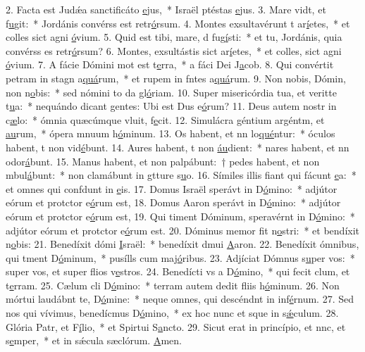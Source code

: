 2. Facta est Judǽa sanctificáto \uline{e}jus,~* Israël ptéstas \uline{e}jus.
3. Mare vidt, et f\uline{u}git:~* Jordánis convérss est retr\uline{ó}rsum.
4. Montes exsultavérunt t ar\uline{í}etes,~* et colles sict agni \uline{ó}vium.
5. Quid est tibi, mare, d fug\uline{í}sti:~* et tu, Jordánis, quia convérss es retr\uline{ó}rsum?
6. Montes, exsultástis sict ar\uline{í}etes,~* et colles, sict agni \uline{ó}vium.
7. A fácie Dómini mot est t\uline{e}rra,~* a fáci Dei J\uline{a}cob.
8. Qui convértit petram in stagn a\uline{quá}rum,~* et rupem in fntes a\uline{quá}rum.
9. Non nobis, Dómin, non n\uline{o}bis:~* sed nómini to da gl\uline{ó}riam.
10. Super misericórdia tua, et veritte t\uline{u}a:~* nequándo dicant gentes: Ubi est Dus e\uline{ó}rum?
11. Deus autem nostr in c\uline{æ}lo:~* ómnia quæcúmque vluit, f\uline{e}cit.
12. Simulácra géntium argéntm, et \uline{au}rum,~* ópera mnuum h\uline{ó}minum.
13. Os habent, et nn lo\uline{qué}ntur:~* óculos habent, t non vid\uline{é}bunt.
14. Aures habent, t non \uline{áu}dient:~* nares habent, et nn odor\uline{á}bunt.
15. Manus habent, et non palpábunt:~† pedes habent, et non mbul\uline{á}bunt:~* non clamábunt in gtture s\uline{u}o.
16. Símiles illis fiant qui fácunt \uline{e}a:~* et omnes qui confdunt in \uline{e}is.
17. Domus Israël sperávt in D\uline{ó}mino:~* adjútor eórum et protctor e\uline{ó}rum est,
18. Domus Aaron sperávt in D\uline{ó}mino:~* adjútor eórum et protctor e\uline{ó}rum est,
19. Qui timent Dóminum, speravérnt in D\uline{ó}mino:~* adjútor eórum et protctor e\uline{ó}rum est.
20. Dóminus memor fit n\uline{o}stri:~* et bendíxit n\uline{o}bis:
21. Benedíxit dómi \uline{I}sraël:~* benedíxit dmui \uline{A}aron.
22. Benedíxit ómnibus, qui tment D\uline{ó}minum,~* pusílls cum maj\uline{ó}ribus.
23. Adjíciat Dómnus s\uline{u}per vos:~* super vos, et super flios v\uline{e}stros.
24. Benedícti vs a D\uline{ó}mino,~* qui fecit clum, et t\uline{e}rram.
25. Cælum cli D\uline{ó}mino:~* terram autem dedit fliis h\uline{ó}minum.
26. Non mórtui laudábnt te, D\uline{ó}mine:~* neque omnes, qui descéndnt in inf\uline{é}rnum.
27. Sed nos qui vívimus, benedícmus D\uline{ó}mino,~* ex hoc nunc et sque in s\uline{ǽ}culum.
28. Glória Patr, et F\uline{í}lio,~* et Spirtui S\uline{a}ncto.
29. Sicut erat in princípio, et nnc, et s\uline{e}mper,~* et in sǽcula sæclórum. \uline{A}men.

